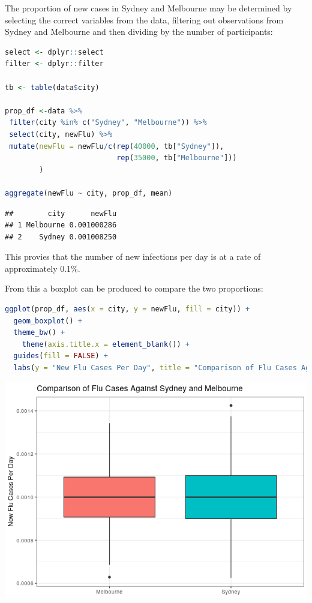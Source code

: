 \documentclass{article}
\begin{document}
The proportion of new cases in Sydney and Melbourne may be determined by
selecting the correct variables from the data, filtering out
observations from Sydney and Melbourne and then dividing by the number
of participants:

\begin{lstlisting}[language=R]
select <- dplyr::select
filter <- dplyr::filter

tb <- table(data$city)

prop_df <-data %>%
 filter(city %in% c("Sydney", "Melbourne")) %>%
 select(city, newFlu) %>%
 mutate(newFlu = newFlu/c(rep(40000, tb["Sydney"]),
                          rep(35000, tb["Melbourne"]))
        )

aggregate(newFlu ~ city, prop_df, mean)
\end{lstlisting}

\begin{lstlisting}
##        city      newFlu
## 1 Melbourne 0.001000286
## 2    Sydney 0.001008250
\end{lstlisting}

This provies that the number of new infections per day is at a rate of
approximately 0.1\%.

From this a boxplot can be produced to compare the two proportions:

\begin{lstlisting}[language=R]
ggplot(prop_df, aes(x = city, y = newFlu, fill = city)) +
  geom_boxplot() +
  theme_bw() +
    theme(axis.title.x = element_blank()) +
  guides(fill = FALSE) +
  labs(y = "New Flu Cases Per Day", title = "Comparison of Flu Cases Against Sydney and Melbourne")
\end{lstlisting}

\includegraphics{main_files/figure-html/unnamed-chunk-9-1.png}
\end{document}
